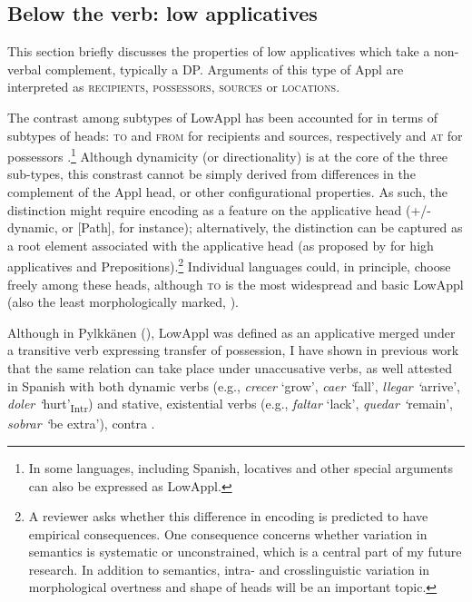 \documentclass[output=paper,colorlinks,citecolor=brown,nonflat]{./langscibook}
\begin{document}
\subsection{Below the verb: low applicatives}\label{sec:cuervo:4.1}

This section briefly discusses the properties of low applicatives which take a non-verbal complement, typically a DP. Arguments of this type of Appl are interpreted as \textsc{recipients}, \textsc{possessors}, \textsc{sources} or \textsc{locations}.

The contrast among subtypes of LowAppl has been accounted for in terms of subtypes of heads: \textsc{to} and \textsc{from} for recipients and sources, respectively \citep{Pylkkänen2008} and \textsc{at} for possessors \citep{Cuervo2003}.\footnote{In some languages, including Spanish, locatives and other special arguments can also be expressed as LowAppl.} Although dynamicity (or directionality) is at the core of the three sub-types, this constrast cannot be simply derived from differences in the complement of the Appl head, or other configurational properties.  As such, the distinction might require encoding as a feature on the applicative head (+/- dynamic, or [Path], for instance); alternatively, the distinction can be captured as a root element associated with the applicative head (as proposed by \citealt{WoodMarantz2017} for high applicatives and Prepositions).\footnote{A reviewer asks whether this difference in encoding is predicted to have empirical consequences. One consequence concerns whether variation in semantics is systematic or unconstrained, which is a central part of my future research. In addition to semantics, intra- and crosslinguistic variation in morphological overtness and shape of heads will be an important topic.} Individual languages could, in principle, choose freely among these heads, although \textsc{to} is the most widespread and basic LowAppl (also the least morphologically marked, \citealt{Cuervo2015Chapter}).

Although in Pylkkänen (\citeyear{Pylkkänen2002,Pylkkänen2008}), LowAppl was defined as an applicative merged under a transitive verb expressing transfer of possession, I have shown in previous work that the same relation can take place under unaccusative verbs, as well attested in Spanish with both dynamic verbs (e.g., \textit{crecer} ‘grow’, \textit{caer ‘}fall’, \textit{llegar ‘}arrive’, \textit{doler ‘}hurt’\textsubscript{Intr}) and stative, existential verbs (e.g., \textit{faltar} ‘lack’, \textit{quedar ‘}remain’, \textit{sobrar ‘}be extra’), contra \citet{Baker1996}.
\end{document}
